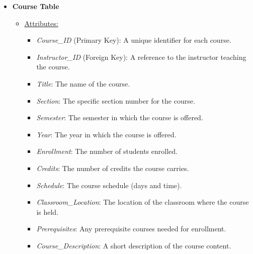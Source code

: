\documentclass[12pt]{article}
\begin{document}
\begin{itemize}
    \item \textbf{Course Table}
    \begin{itemize}
        \item \underline{Attributes:}
        \begin{itemize}
            \item \textit{Course\_ID} (Primary Key): A unique identifier for each course.
            \item \textit{Instructor\_ID} (Foreign Key): A reference to the instructor teaching the course.
            \item \textit{Title}: The name of the course.
            \item \textit{Section}: The specific section number for the course.
            \item \textit{Semester}: The semester in which the course is offered.
            \item \textit{Year}: The year in which the course is offered.
            \item \textit{Enrollment}: The number of students enrolled.
            \item \textit{Credits}: The number of credits the course carries.
            \item \textit{Schedule}: The course schedule (days and time).
            \item \textit{Classroom\_Location}: The location of the classroom where the course is held.
            \item \textit{Prerequisites}: Any prerequisite courses needed for enrollment.
            \item \textit{Course\_Description}: A short description of the course content.
        \end{itemize}
    \end{itemize}
    

\end{itemize}
\end{document}
